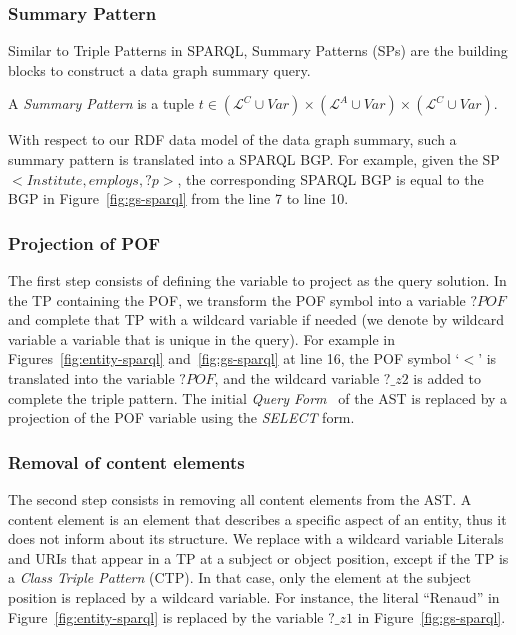 \subsubsection{Summary Pattern}

Similar to Triple Patterns in SPARQL, Summary Patterns (SPs) are the building blocks to construct a data graph summary query.

\begin{definition}
A \emph{Summary Pattern} is a tuple $t \in  (\mathcal{L}^C \cup Var) \times (\mathcal{L}^A \cup Var) \times (\mathcal{L}^C \cup Var)$.
\label{def:summary-triple-pattern}
\end{definition}

With respect to our RDF data model of the data graph summary, such a summary pattern is translated into a SPARQL BGP. For example, given the SP \mbox{$<Institute, employs, ?p>$}, the corresponding SPARQL BGP is equal to the BGP in Figure~\ref{fig:gs-sparql} from the line 7 to line 10.

\subsubsection{Projection of POF}

The first step consists of defining the variable to project as the query solution. In the TP containing the POF, we transform the POF symbol into a variable $?POF$ and complete that TP with a wildcard variable if needed (we denote by wildcard variable a variable that is unique in the query). For example in Figures~\ref{fig:entity-sparql} and~\ref{fig:gs-sparql} at line 16, the POF symbol `$<$' is translated into the variable $?POF$, and the wildcard variable $?\_z2$ is added to complete the triple pattern.
The initial \emph{Query Form}~\cite{PrudS08} of the AST is replaced by a projection of the POF variable using the \emph{SELECT} form.

\subsubsection{Removal of content elements}

The second step consists in removing all content elements from the AST. A content element is an element that describes a specific aspect of an entity, thus it does not inform about its structure. We replace with a wildcard variable Literals and URIs that appear in a TP at a subject or object position, except if the TP is a \emph{Class Triple Pattern} (CTP). In that case, only the element at the subject position is replaced by a wildcard variable. For instance, the literal ``Renaud'' in Figure~\ref{fig:entity-sparql} is replaced by the variable $?\_z1$ in Figure~\ref{fig:gs-sparql}.

